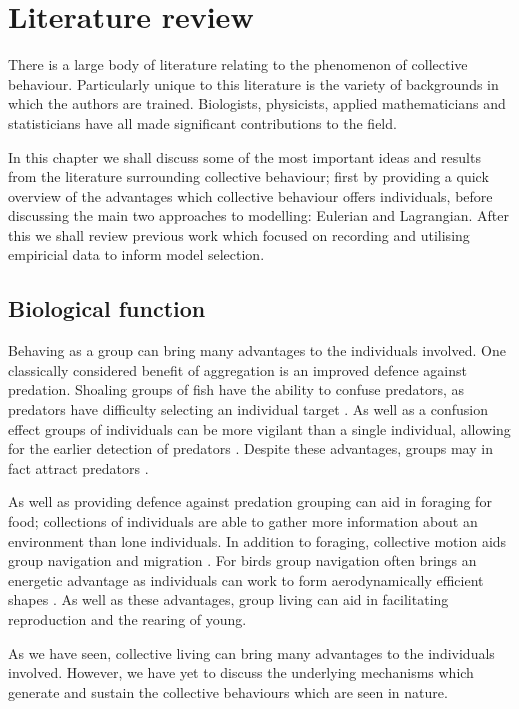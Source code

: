 \chapter{Literature review}
\label{cha:lit_review}

There is a large body of literature relating to the phenomenon of collective behaviour. Particularly unique to this literature is the variety of backgrounds in which the authors are trained. Biologists, physicists, applied mathematicians and statisticians have all made significant contributions to the field.

In this chapter we shall discuss some of the most important ideas and results from the literature surrounding collective behaviour; first by providing a quick overview of the advantages which collective behaviour offers individuals, before discussing the main two approaches to modelling: Eulerian and Lagrangian. After this we shall review previous work which focused on recording and utilising empiricial data to inform model selection.

\section{Biological function}
\label{sec:biological_function}

Behaving as a group can bring many advantages to the individuals involved. One classically considered  benefit of aggregation is an improved defence against predation. Shoaling groups of fish have the ability to confuse predators, as predators have difficulty selecting an individual target \citep{landeau86}. As well as a confusion effect groups of individuals can be more vigilant than a single individual, allowing for the earlier detection of predators \citep{pitcher93}. Despite these advantages, groups may in fact attract predators \citep{wittenberger85}.

As well as providing defence against predation grouping can aid in foraging for food; collections of individuals are able to gather more information about an environment than lone individuals. In addition to foraging, collective motion aids group navigation and migration \citep{simmons04}. For birds group navigation often brings an energetic advantage as individuals can work to form aerodynamically efficient shapes \citep{weimerskirch01}. As well as these advantages, group living can aid in facilitating reproduction and the rearing of young.

As we have seen, collective living can bring many advantages to the individuals involved. However, we have yet to discuss the underlying mechanisms which generate and sustain the collective behaviours which are seen in nature.

